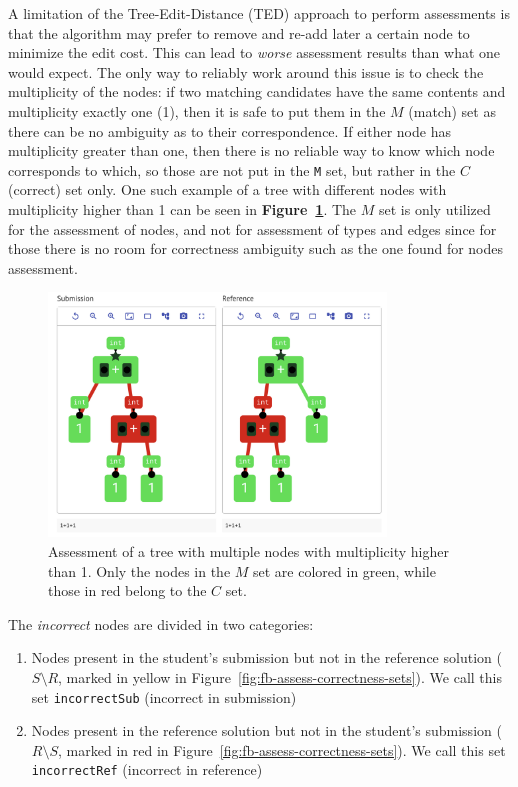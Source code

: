\begin{chapterBody}
A limitation of the Tree-Edit-Distance (TED) approach to perform assessments
is that the algorithm may prefer to remove and re-add later a certain node
to minimize the edit cost. This can lead to \textit{worse} assessment
results than what one would expect.
The only way to reliably work around this issue is to check the multiplicity
of the nodes: if two matching candidates have the same contents and 
multiplicity exactly one (1), then it is safe to put them in the $ M $
(match) set as there can be no ambiguity as to their correspondence.
If either node has multiplicity greater than one, then there is no reliable way
to know which node corresponds to which, so those are not put in the \texttt{M}
set, but rather in the $ C $ (correct) set only. One such example of
a tree with different nodes with multiplicity higher than 1 can be seen in
\textbf{Figure~\ref{fig:fb-assess-multiplicty}}. The $ M $ set is only
utilized for the assessment of nodes, and not for assessment of types and
edges since for those there is no room for correctness ambiguity such as the
one found for nodes assessment.

\begin{figure}
    \centering
    \includegraphics[width=0.8\textwidth]
                    {res/7/assessment_multiplicity.png}
    \caption{Assessment of a tree with multiple nodes with multiplicity higher
than 1. Only the nodes in the $ M $ set are colored in green, while those
in red belong to the $ C $ set.}
    \label{fig:fb-assess-multiplicty}
\end{figure}

The \textit{incorrect} nodes are divided in two categories:
\begin{enumerate}
    \item Nodes present in the student's submission but not in the reference
solution ($ S \setminus R $, marked in yellow in
Figure~\ref{fig:fb-assess-correctness-sets}). We call this set 
\texttt{incorrectSub} (incorrect in submission)
    \item Nodes present in the reference solution but not in the student's
submission ($ R \setminus S $, marked in red in
Figure~\ref{fig:fb-assess-correctness-sets}). We call this set 
\texttt{incorrectRef} (incorrect in reference)
\end{enumerate}


\end{chapterBody}
